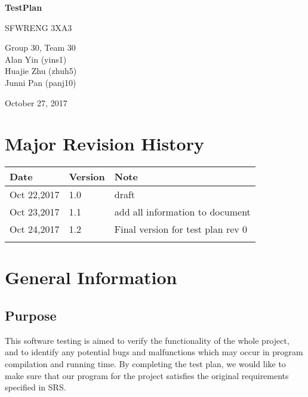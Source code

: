 \documentclass[12pt]{article}
\begin{document}
\begin{titlepage}
    \begin{center}
        \vspace*{1cm}
        
        \Huge
        \textbf{TestPlan}
        
        \vspace{0.5cm}
        \LARGE
        SFWRENG 3XA3
        
        \vspace{1.5cm}
        
\Large
        Group 30, Team 30
		\\ Alan Yin (yins1)
		\\ Huajie Zhu (zhuh5)
		\\ Junni Pan (panj10)
        
        \vspace{1.5cm}
        
        \Large
        October 27, 2017
        
    \end{center}
\end{titlepage}
\newpage
\tableofcontents
\listoftables
\listoffigures


\newpage
\section{Major Revision History}
\begin{table}[h!]
\centering
\begin{tabular}{ | m{10em} | m{1.5cm}| m{5cm}|} 
\hline
Date & Version & Note \\ 
\hline
Oct 22,2017 & 1.0 & draft \\ 
\hline
Oct 23,2017 & 1.1 & add all information to document \\ 
\hline
Oct 24,2017 & 1.2 & Final version for test plan rev 0 \\ 
\hline
\color{red}{Dec 06,2017} & \color{red}{1.2} & \color{red}{Final version for test plan rev 1} \\ 
\hline
\end{tabular}
\end{table}


\section{General Information}
	\subsection{Purpose}
	This software testing is aimed to verify the functionality of the whole project, and to identify any potential bugs and malfunctions which may occur in program compilation and running time. By completing the test plan, we would like to make sure that our program for the project satisfies the original requirements specified in SRS.
\end{document}

